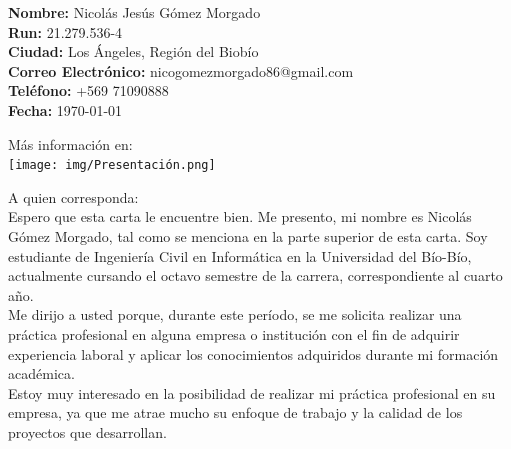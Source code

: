 \documentclass{templateNote}
\begin{document}


\portada
\margenes 

\noindent
\begin{minipage}[t]{0.7\textwidth}
    \textbf{Nombre:} Nicolás Jesús Gómez Morgado\\
    \textbf{Run:} 21.279.536-4\\
    \textbf{Ciudad:} Los Ángeles, Región del Biobío\\
    \textbf{Correo Electrónico:} nicogomezmorgado86@gmail.com\\
    \textbf{Teléfono:} +569 71090888\\
    \textbf{Fecha:} \today\\
\end{minipage}
\begin{minipage}[t]{0.3\textwidth}
    \centering
    Más información en:\\
    \vspace*{0.3cm} %
    \texttt{[image: img/Presentación.png]} 
\end{minipage}

\vspace*{0.5cm}
\noindent A quien corresponda:\\

\noindent Espero que esta carta le encuentre bien. Me presento, mi nombre es Nicolás Gómez Morgado, tal como se menciona en la parte superior de esta carta. Soy estudiante de Ingeniería Civil en Informática en la Universidad del Bío-Bío, actualmente cursando el octavo semestre de la carrera, correspondiente al cuarto año.\\

\noindent Me dirijo a usted porque, durante este período, se me solicita realizar una práctica profesional en alguna empresa o institución con el fin de adquirir experiencia laboral y aplicar los conocimientos adquiridos durante mi formación académica.\\

\noindent Estoy muy interesado en la posibilidad de realizar mi práctica profesional en su empresa, ya que me atrae mucho su enfoque de trabajo y la calidad de los proyectos que desarrollan.\\%
\end{document}
